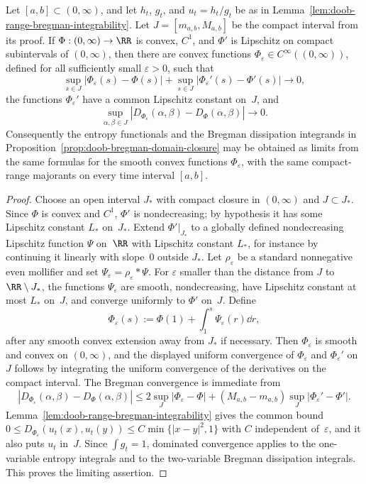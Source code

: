 \begin{lemma}%
\label{lem:compact-range-phi-approximation}
Let $[a,b]\subset(0,\infty)$, and let $h_t$, $g_t$, and $u_t=h_t/g_t$ be as
in Lemma~\ref{lem:doob-range-bregman-integrability}.  Let
$J=[m_{a,b},M_{a,b}]$ be the compact interval from its proof.  If
$\Phi:(0,\infty)\to\RR$ is convex, $C^1$, and $\Phi'$ is Lipschitz on compact
subintervals of $(0,\infty)$, then there are convex functions
$\Phi_\varepsilon\in C^\infty((0,\infty))$, defined for all sufficiently small
$\varepsilon>0$, such that
\[
\sup_{s\in J}|\Phi_\varepsilon(s)-\Phi(s)|
+\sup_{s\in J}|\Phi_\varepsilon'(s)-\Phi'(s)|\longrightarrow0,
\]
the functions $\Phi_\varepsilon'$ have a common Lipschitz constant on~$J$, and
\[
\sup_{\alpha,\beta\in J}
|D_{\Phi_\varepsilon}(\alpha,\beta)-D_\Phi(\alpha,\beta)|\longrightarrow0.
\]
Consequently the entropy functionals and the Bregman dissipation integrands in
Proposition~\ref{prop:doob-bregman-domain-closure} may be obtained as limits
from the same formulas for the smooth convex functions $\Phi_\varepsilon$,
with the same compact-range majorants on every time interval $[a,b]$.
\end{lemma}

\begin{proof}
Choose an open interval $J_*$ with compact closure in $(0,\infty)$ and
$J\subset J_*$.  Since $\Phi$ is convex and $C^1$, $\Phi'$ is nondecreasing;
by hypothesis it has some Lipschitz constant $L_*$ on~$J_*$.  Extend
$\Phi'|_{J_*}$ to a globally defined nondecreasing Lipschitz function
$\Psi$ on~$\RR$ with Lipschitz constant $L_*$, for instance by continuing it
linearly with slope~$0$ outside $J_*$.  Let $\rho_\varepsilon$ be a standard
nonnegative even mollifier and set
$\Psi_\varepsilon=\rho_\varepsilon*\Psi$.  For $\varepsilon$ smaller than the
distance from $J$ to $\RR\setminus J_*$, the functions
$\Psi_\varepsilon$ are smooth, nondecreasing, have Lipschitz constant at most
$L_*$ on~$J$, and converge uniformly to $\Phi'$ on~$J$.
Define
\[
\Phi_\varepsilon(s):=\Phi(1)+\int_1^s\Psi_\varepsilon(r)\dd r,
\]
after any smooth convex extension away from $J_*$ if necessary.  Then
$\Phi_\varepsilon$ is smooth and convex on $(0,\infty)$, and the displayed
uniform convergence of $\Phi_\varepsilon$ and $\Phi_\varepsilon'$ on~$J$
follows by integrating the uniform convergence of the derivatives on the
compact interval.  The Bregman convergence is immediate from
\[
|D_{\Phi_\varepsilon}(\alpha,\beta)-D_\Phi(\alpha,\beta)|
\le 2\sup_J|\Phi_\varepsilon-\Phi|
 +(M_{a,b}-m_{a,b})\sup_J|\Phi_\varepsilon'-\Phi'|.
\]
Lemma~\ref{lem:doob-range-bregman-integrability} gives the common bound
$0\le D_{\Phi_\varepsilon}(u_t(x),u_t(y))
\le C\min\{|x-y|^2,1\}$ with $C$ independent of~$\varepsilon$, and it also
puts $u_t$ in~$J$.  Since $\int g_t=1$, dominated convergence applies to the
one-variable entropy integrals and to the two-variable Bregman dissipation
integrals.  This proves the limiting assertion.
\end{proof}

